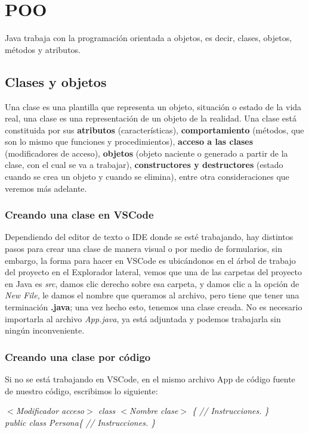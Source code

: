 \section{POO}

Java trabaja con la programación orientada a objetos, es decir, clases, objetos, métodos y atributos.


\subsection{Clases y objetos}
\hspace{0.55cm}Una clase es una plantilla que representa un objeto, situación o estado de la vida real, una clase es una representación de un objeto de la realidad. Una clase está constituida por sus \textbf{atributos} (características), \textbf{comportamiento} (métodos, que son lo mismo que funciones y procedimientos), \textbf{acceso a las clases} (modificadores de acceso), \textbf{objetos} (objeto naciente o generado a partir de la clase, con el cual se va a trabajar), \textbf{constructores y destructores} (estado cuando se crea un objeto y cuando se elimina), entre otra consideraciones que veremos más adelante.


\subsubsection{Creando una clase en VSCode}
\hspace{0.55cm}Dependiendo del editor de texto o IDE donde se esté trabajando, hay distintos pasos para crear una clase de manera visual o por medio de formularios, sin embargo, la forma para hacer en VSCode es ubicándonos en el árbol de trabajo del proyecto en el Explorador lateral, vemos que una de las carpetas del proyecto en Java es \textit{src}, damos clic derecho sobre esa carpeta, y damos clic a la opción de \textit{New File}, le damos el nombre que queramos al archivo, pero tiene que tener una terminación \textbf{.java}; una vez hecho esto, tenemos una clase creada. No es necesario importarla al archivo \textit{App.java}, ya está adjuntada y podemos trabajarla sin ningún inconveniente.


\subsubsection{Creando una clase por código}
\hspace{0.55cm}Si no se está trabajando en VSCode, en el mismo archivo App de código fuente de nuestro código, escribimos lo siguiente:
\begin{center}
	\textit{
		$<$Modificador acceso$>$ class $<$Nombre clase$>$ \{ // Instrucciones. \} \\
		public class Persona\{ // Instrucciones. \}
	}
\end{center}

